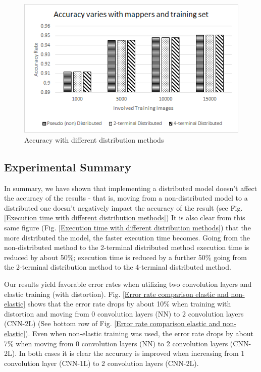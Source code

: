 \begin {figure}[t]
\centering
\includegraphics[width=1\columnwidth]{FigAccuracyPerf.png}
\vspace{-10pt}
\caption{Accuracy with different distribution methods}
\label{Accuracy with different distribution methods}
\vspace{-10pt}
\end {figure}


\subsection{Experimental Summary}
\label{subsec:ExpSummary}

In summary, we have shown that implementing a distributed model doesn't affect the accuracy of the results - that is, moving from a non-distributed model to a distributed one doesn't negatively impact the accuracy of the result (see Fig. \ref{Execution time with different distribution methods}) It is also clear from this same figure (Fig. \ref{Execution time with different distribution methods}) that the more distributed the model, the faster execution time becomes. Going from the non-distributed method to the 2-terminal distributed method execution time is reduced by about 50\%; execution time is reduced by a further 50\% going from the 2-terminal distribution method to the 4-terminal distributed method.  

Our results yield favorable error rates when utilizing two convolution layers and elastic training (with distortion). Fig. \ref{Error rate comparison elastic and non-elastic} shows that the error rate drops by about 10\% when training with distortion and moving from 0 convolution layers (NN) to 2 convolution layers (CNN-2L) (See bottom row of Fig. \ref{Error rate comparison elastic and non-elastic}). Even when non-elastic training was used, the error rate drops by about 7\% when moving from 0 convolution layers (NN) to 2 convolution layers (CNN-2L). In both cases it is clear the accuracy is improved when increasing from 1 convolution layer (CNN-1L) to 2 convolution layers (CNN-2L). 

